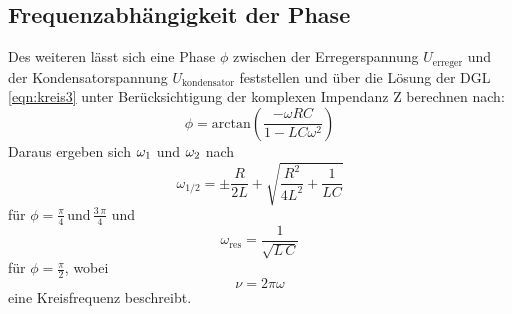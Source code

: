 \subsection{Frequenzabhängigkeit der Phase}
Des weiteren lässt sich eine Phase $\phi$ zwischen der Erregerspannung
$U_\text{erreger}$ und der Kondensatorspannung $U_\text{kondensator}$  feststellen und über
die Lösung der DGL \eqref{eqn:kreis3} unter Berücksichtigung der komplexen Impendanz Z berechnen nach:
\begin{equation}
  \phi = \text{arctan}\left(\frac{-\omega RC}{1-LC\omega^2}\right)
  \label{eqn:phase}
\end{equation}
Daraus ergeben sich $\omega_\text1$ und $\omega_\text2$ nach
\begin{equation}
  \omega_{1/2} = \pm \frac{R}{2L} + \sqrt{\frac{R^{2}}{4L^{2}} + \frac{1}{LC}}
  \label{o12}
\end{equation}
für $\phi = \frac{\pi}{4}\,\text{und}\, \frac{3\,\pi}{4}$ und
\begin{equation}
  \omega_{\text{res}} = \frac{1}{\sqrt{L\,C}}
  \label{eqn:ores}
\end{equation}
für $\phi = \frac{\pi}{2}$, wobei
\begin{equation}
  \nu = 2\pi\omega
  \label{c1}
\end{equation}
eine Kreisfrequenz beschreibt.
